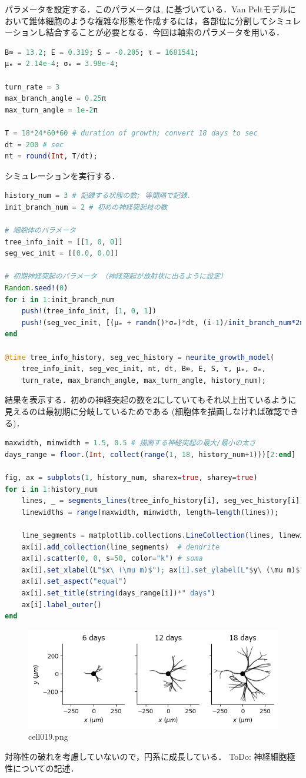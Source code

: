 パラメータを設定する．このパラメータは\citep{Koene2009-hv}, \citep{Van_Ooyen2014-fb}に基づいている．Van Peltモデルにおいて錐体細胞のような複雑な形態を作成するには，各部位に分割してシミュレーションし結合することが必要となる．今回は軸索のパラメータを用いる．
\begin{lstlisting}[language=julia]
B∞ = 13.2; E = 0.319; S = -0.205; τ = 1681541; 
μₑ = 2.14e-4; σₑ = 3.98e-4;

turn_rate = 3
max_branch_angle = 0.25π
max_turn_angle = 1e-2π

T = 18*24*60*60 # duration of growth; convert 18 days to sec
dt = 200 # sec
nt = round(Int, T/dt);
\end{lstlisting}
シミュレーションを実行する．
\begin{lstlisting}[language=julia]
history_num = 3 # 記録する状態の数; 等間隔で記録．
init_branch_num = 2 # 初めの神経突起枝の数

# 細胞体のパラメータ
tree_info_init = [[1, 0, 0]]
seg_vec_init = [[0.0, 0.0]]

# 初期神経突起のパラメータ （神経突起が放射状に出るように設定）
Random.seed!(0)
for i in 1:init_branch_num
    push!(tree_info_init, [1, 0, 1])
    push!(seg_vec_init, [(μₑ + randn()*σₑ)*dt, (i-1)/init_branch_num*2π+1e-2*randn()])
end

@time tree_info_history, seg_vec_history = neurite_growth_model(
    tree_info_init, seg_vec_init, nt, dt, B∞, E, S, τ, μₑ, σₑ,
    turn_rate, max_branch_angle, max_turn_angle, history_num);
\end{lstlisting}
結果を表示する．初めの神経突起の数を2にしていてもそれ以上出ているように見えるのは最初期に分岐しているためである (細胞体を描画しなければ確認できる)．
\begin{lstlisting}[language=julia]
maxwidth, minwidth = 1.5, 0.5 # 描画する神経突起の最大/最小の太さ
days_range = floor.(Int, collect(range(1, 18, history_num+1)))[2:end]

fig, ax = subplots(1, history_num, sharex=true, sharey=true)
for i in 1:history_num
    lines, _ = segments_lines(tree_info_history[i], seg_vec_history[i]);
    linewidths = range(maxwidth, minwidth, length=length(lines));

    line_segments = matplotlib.collections.LineCollection(lines, linewidths=linewidths, color="k")
    ax[i].add_collection(line_segments)  # dendrite
    ax[i].scatter(0, 0, s=50, color="k") # soma
    ax[i].set_xlabel(L"$x\ (\mu m)$"); ax[i].set_ylabel(L"$y\ (\mu m)$")
    ax[i].set_aspect("equal")
    ax[i].set_title(string(days_range[i])*" days")
    ax[i].label_outer()
end
\end{lstlisting}
\begin{figure}[ht]
	\centering
	\includegraphics[scale=0.8, max width=\linewidth]{./fig/neuron-model/neurite-growth-model/cell019.png}
	\caption{cell019.png}
	\label{cell019.png}
\end{figure}
対称性の破れを考慮していないので，円系に成長している．
ToDo: 神経細胞極性についての記述．
